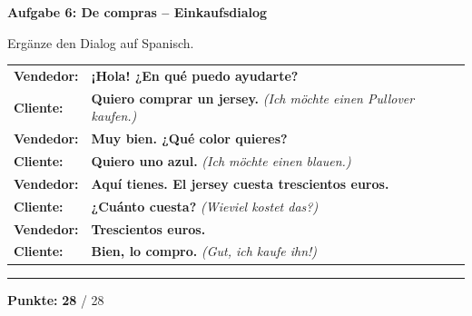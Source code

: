 \documentclass[11pt, a4paper]{article}
\newcommand{\maxpunkte}{28}
\newcommand{\punktebox}[1]{\hfill\fbox{\scriptsize \_\kern-1pt/#1}}
\newcommand{\es}[1]{\textcolor{spanisch}{\textbf{#1}}}
\newcommand{\lsg}[1]{\textcolor{loesung}{\textbf{#1}}}
\begin{document}
\textbf{\textcolor{spanisch}{Aufgabe 6: De compras -- Einkaufsdialog}} \punktebox{4}

\vspace{3pt}
\small
Ergänze den Dialog auf Spanisch.

\vspace{5pt}

\begin{tabular}{@{}p{2cm}p{13cm}@{}}
\textbf{Vendedor:} & \es{¡Hola! ¿En qué puedo ayudarte?} \\[0.6em]
\textbf{Cliente:} & \lsg{Quiero comprar un jersey.} \hfill \textit{(Ich möchte einen Pullover kaufen.)} \\[0.6em]
\textbf{Vendedor:} & \es{Muy bien. ¿Qué color quieres?} \\[0.6em]
\textbf{Cliente:} & \lsg{Quiero uno azul.} \hfill \textit{(Ich möchte einen blauen.)} \\[0.6em]
\textbf{Vendedor:} & \es{Aquí tienes. El jersey cuesta trescientos euros.} \\[0.6em]
\textbf{Cliente:} & \lsg{¿Cuánto cuesta?} \hfill \textit{(Wieviel kostet das?)} \\[0.6em]
\textbf{Vendedor:} & \es{Trescientos euros.} \\[0.6em]
\textbf{Cliente:} & \lsg{Bien, lo compro.} \hfill \textit{(Gut, ich kaufe ihn!)} \\
\end{tabular}


\vspace{6pt}
\hrule
\vspace{4pt}

\begin{flushright}
\textbf{Punkte:} \lsg{28} / \maxpunkte
\end{flushright}

\vspace{6pt}

\end{document}
